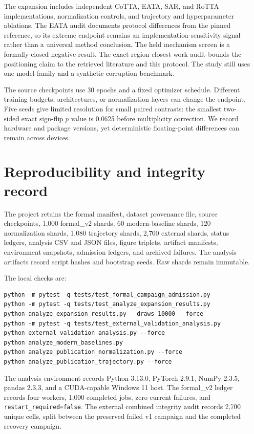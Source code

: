 \documentclass[11pt]{article}
\begin{document}
The expansion includes independent CoTTA, EATA, SAR, and RoTTA implementations, normalization controls, and trajectory and hyperparameter ablations. The EATA audit documents protocol differences from the pinned reference, so its extreme endpoint remains an implementation-sensitivity signal rather than a universal method conclusion. The held mechanism screen is a formally closed negative result. The exact-region closest-work audit bounds the positioning claim to the retrieved literature and this protocol. The study still uses one model family and a synthetic corruption benchmark.

The source checkpoints use 30 epochs and a fixed optimizer schedule. Different training budgets, architectures, or normalization layers can change the endpoint. Five seeds give limited resolution for small paired contrasts: the smallest two-sided exact sign-flip $p$ value is 0.0625 before multiplicity correction. We record hardware and package versions, yet deterministic floating-point differences can remain across devices.

\section{Reproducibility and integrity record}
\label{sec:repro}

The project retains the formal manifest, dataset provenance file, source checkpoints, 1,000 formal\_v2 shards, 60 modern-baseline shards, 120 normalization shards, 1,080 trajectory shards, 2,700 external shards, status ledgers, analysis CSV and JSON files, figure triplets, artifact manifests, environment snapshots, admission ledgers, and archived failures. The analysis artifacts record script hashes and bootstrap seeds. Raw shards remain immutable.

The local checks are:
\begin{verbatim}
python -m pytest -q tests/test_formal_campaign_admission.py
python -m pytest -q tests/test_analyze_expansion_results.py
python analyze_expansion_results.py --draws 10000 --force
python -m pytest -q tests/test_external_validation_analysis.py
python external_validation_analysis.py --force
python analyze_modern_baselines.py
python analyze_publication_normalization.py --force
python analyze_publication_trajectory.py --force
\end{verbatim}
The analysis environment records Python 3.13.0, PyTorch 2.9.1, NumPy 2.3.5, pandas 2.3.3, and a CUDA-capable Windows 11 host. The formal\_v2 ledger records four workers, 1,000 completed jobs, zero current failures, and \texttt{restart\_required=false}. The external combined integrity audit records 2,700 unique cells, split between the preserved failed v1 campaign and the completed recovery campaign.
\end{document}
